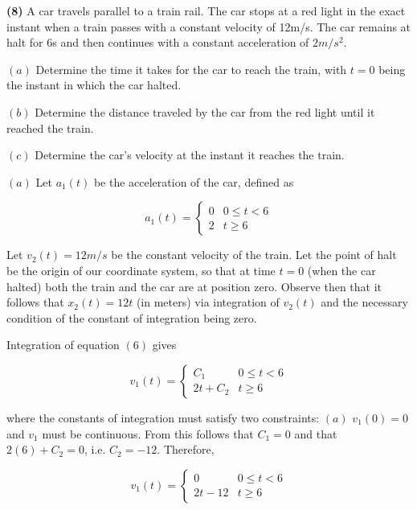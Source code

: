 \documentclass[12pt]{article}
\theoremstyle{definition}
\begin{document}
\begin{shaded}
    \textbf{(8)} A car travels parallel to a train rail. The car stops at a red
    light in the exact instant when a train passes with a constant velocity of
    12m/s. The car remains at halt for 6s and then continues with a constant
    acceleration of $2m / s^2$.

    $(a)$ Determine the time it takes for the car to reach the train, with $t =
    0$ being the instant in which the car halted. 

    $(b)$ Determine the distance traveled by the car from the red light until it
    reached the train. 

    $(c)$ Determine the car's velocity at the instant it reaches the train.
\end{shaded}

$(a)$ Let $a_1(t)$ be the acceleration of the car, defined as 

\begin{equation}
    a_1(t) = \begin{cases}
        0 & 0 \leq t < 6 \\ 
        2 & t \geq 6
    \end{cases}
\end{equation}

Let $v_2(t) = 12 m / s$ be the constant velocity of the train. Let the point of
halt be the origin of our coordinate system, so that at time $t = 0$ (when the
car halted) both the train and the car are at position zero. Observe then that
it follows that $x_2(t) = 12t$ (in meters) via integration of $v_2(t)$ and the
necessary condition of the constant of integration being zero.

Integration of equation $(6)$ gives

\begin{equation}
    v_1(t) = \begin{cases}
        C_1 & 0 \leq t < 6 \\ 
        2t + C_2 & t \geq 6
    \end{cases} 
\end{equation}

where the constants of integration must satisfy two constraints: $(a)$ $v_1(0) =
0$ and $v_1$ must be continuous. From this follows that $C_1 = 0$ and that 
$2(6) + C_2 = 0$, i.e. $C_2 = -12 $. Therefore, 

\begin{equation}
    v_1(t) = \begin{cases}
        0 & 0 \leq t < 6 \\ 
        2 t - 12 & t \geq 6
    \end{cases}
\end{equation}
\end{document}
